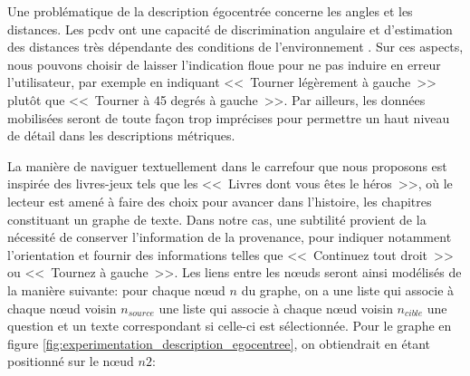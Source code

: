Une problématique de la description égocentrée concerne les angles et les distances. Les \gls{pcdv} ont une capacité de discrimination angulaire et d’estimation des distances très dépendante des conditions de l’environnement \citep{ratelle_manuel_2019}. Sur ces aspects, nous pouvons choisir de laisser l'indication floue pour ne pas induire en erreur l'utilisateur, par exemple en indiquant <<~Tourner légèrement à gauche~>> plutôt que <<~Tourner à 45 degrés à gauche~>>. Par ailleurs, les données mobilisées seront de toute façon trop imprécises pour permettre un haut niveau de détail dans les descriptions métriques.

\newpar{}

La manière de naviguer textuellement dans le carrefour que nous proposons est inspirée des livres-jeux tels que les <<~Livres dont vous êtes le héros~>>, où le lecteur est amené à faire des choix pour avancer dans l'histoire, les chapitres constituant un graphe de texte. Dans notre cas, une subtilité provient de la nécessité de conserver l'information de la provenance, pour indiquer notamment l'orientation et fournir des informations telles que <<~Continuez tout droit~>> ou <<~Tournez à gauche~>>. Les liens entre les nœuds seront ainsi modélisés de la manière suivante: pour chaque nœud $n$ du graphe, on a une liste qui associe à chaque nœud voisin $n_{source}$ une liste qui associe à chaque nœud voisin $n_{cible}$ une question et un texte correspondant si celle-ci est sélectionnée. Pour le graphe en figure \ref{fig:experimentation_description_egocentree}, on obtiendrait en étant positionné sur le nœud $n2$:

